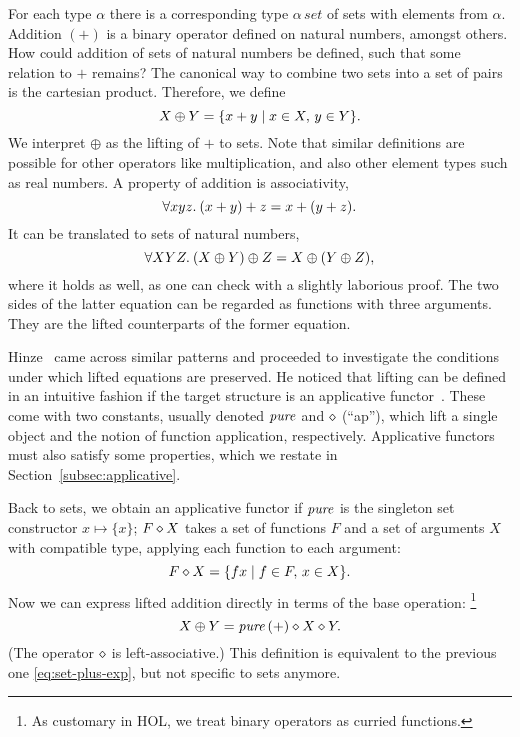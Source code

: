 \begin{example}\label{exmp:set-intro}
For each type $\alpha$ there is a corresponding type $\alpha\,\mathit{set}$
of sets with elements from $\alpha$.
Addition $(+)$ is a binary operator defined on natural numbers, amongst others.
How could addition of sets of natural numbers be defined, such that some
relation to $+$ remains?
The canonical way to combine two sets into a set of pairs is the cartesian
product.
Therefore, we define
\begin{equation}\label{eq:set-plus-exp}
	X \oplus Y = \{x + y\mid x \in X,\, y \in Y\}.
\end{equation}
We interpret $\oplus$ as the lifting of $+$ to sets.
Note that similar definitions are possible for other operators like
multiplication, and also other element types such as real numbers.
A property of addition is associativity,
\begin{equation}\label{eq:plus-assoc}
	\forall x y z.\>(x + y) + z = x + (y + z).
\end{equation}
It can be translated to sets of natural numbers,
\begin{equation}\label{eq:set-plus-assoc}
	\forall X Y Z.\>(X \oplus Y) \oplus Z = X \oplus (Y \oplus Z),
\end{equation}
where it holds as well, as one can check with a slightly laborious proof.
The two sides of the latter equation can be regarded as functions with three
arguments.
They are the lifted counterparts of the former equation.
\end{example}

Hinze~\cite{hinze10} came across similar patterns and proceeded to investigate
the conditions under which lifted equations are preserved.
He noticed that lifting can be defined in an intuitive fashion if the target
structure is an applicative functor~\cite{mcbride08}.
These come with two constants, usually denoted $\operatorname{\mathit{pure}}$ and $\diamond$ (``ap''),
which lift a single object and the notion of function application, respectively.
Applicative functors must also satisfy some properties, which we restate in
Section~\ref{subsec:applicative}.

\addtocounter{example}{-1}
\begin{example}[continued]
Back to sets, we obtain an applicative functor if $\operatorname{\mathit{pure}}$ is the singleton set
constructor $x \mapsto \{x\}$;
$F \diamond X$ takes a set of functions $F$ and a set of arguments $X$
with compatible type, applying each function to each argument:
\[ F \diamond X = \{f x\mid f \in F,\, x \in X\}. \]
Now we can express lifted addition directly in terms of the base operation:%
\footnote{As customary in HOL, we treat binary operators as curried functions.}
\[ X \oplus Y = \operatorname{\mathit{pure}}{(+)} \diamond X \diamond Y. \]
(The operator $\diamond$ is left-associative.)
This definition is equivalent to the previous one \eqref{eq:set-plus-exp},
but not specific to sets anymore.
\end{example}

